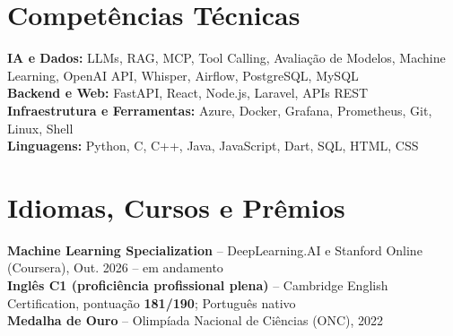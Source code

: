 \documentclass[10pt,a4paper]{article}
\begin{document}
\section*{Competências Técnicas}

\textbf{IA e Dados:}
LLMs, RAG, MCP, Tool Calling, Avaliação de Modelos, Machine Learning, OpenAI API, Whisper,
Airflow, PostgreSQL, MySQL\\
\textbf{Backend e Web:}
FastAPI, React, Node.js, Laravel, APIs REST\\
\textbf{Infraestrutura e Ferramentas:}
Azure, Docker, Grafana, Prometheus, Git, Linux, Shell\\
\textbf{Linguagens:}
Python, C, C++, Java, JavaScript, Dart, SQL, HTML, CSS

\section*{Idiomas, Cursos e Prêmios}

\textbf{Machine Learning Specialization} -- DeepLearning.AI e Stanford Online (Coursera), Out. 2026 -- em andamento\\
\textbf{Inglês C1 (proficiência profissional plena)} -- Cambridge English Certification, pontuação \textbf{181/190}; Português nativo\\
\textbf{Medalha de Ouro} -- Olimpíada Nacional de Ciências (ONC), 2022
\end{document}
